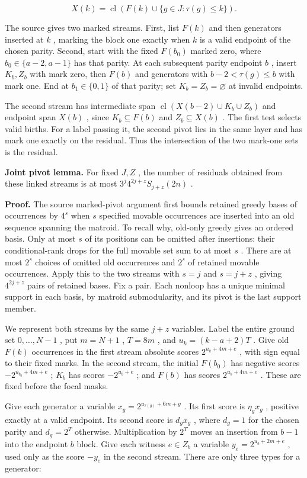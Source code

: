 \documentclass[11pt]{article}
\begin{document}
\[X(k)=\operatorname{cl}(F(k)\cup\{g\in J:\tau(g)\le k\}).\]

The source gives two marked streams. First, list \(F(k)\) and then generators inserted at \(k\) , marking the block one exactly when \(k\) is a valid endpoint of the chosen parity. Second, start with the fixed \(F(b_0)\) marked zero, where \(b_0\in\{a-2,a-1\}\) has that parity. At each subsequent parity endpoint \(b\) , insert \(K_b,Z_b\) with mark zero, then \(F(b)\) and generators with \(b-2<\tau(g)\le b\) with mark one. End at \(b_1\in\{0,1\}\) of that parity; set \(K_b=Z_b=\varnothing\) at invalid endpoints.

The second stream has intermediate span \(\operatorname{cl}(X(b-2)\cup K_b\cup Z_b)\) and endpoint span \(X(b)\) , since \(K_b\subseteq F(b)\) and \(Z_b\subseteq X(b)\) . The first test selects valid births. For a label passing it, the second pivot lies in the same layer and has mark one exactly on the residual. Thus the intersection of the two mark-one sets is the residual.

\textbf{Joint pivot lemma.} For fixed \(J,Z\) , the number of residuals obtained from these linked streams is at most \(3^j4^{2j+z}S_{j+z}(2n)\) .

\textbf{Proof.} The source marked-pivot argument first bounds retained greedy bases of occurrences by \(4^s\) when \(s\) specified movable occurrences are inserted into an old sequence spanning the matroid. To recall why, old-only greedy gives an ordered basis. Only at most \(s\) of its positions can be omitted after insertions: their conditional-rank drops for the full movable set sum to at most \(s\) . There are at most \(2^s\) choices of omitted old occurrences and \(2^s\) of retained movable occurrences. Apply this to the two streams with \(s=j\) and \(s=j+z\) , giving \(4^{2j+z}\) pairs of retained bases. Fix a pair. Each nonloop has a unique minimal support in each basis, by matroid submodularity, and its pivot is the last support member.

We represent both streams by the same \(j+z\) variables. Label the entire ground set \(0,\ldots,N-1\) , put \(m=N+1\) , \(T=8m\) , and \(u_k=(k-a+2)T\) . Give old \(F(k)\) occurrences in the first stream absolute scores \(2^{u_k+4m+e}\) , with sign equal to their fixed marks. In the second stream, the initial \(F(b_0)\) has negative scores \(-2^{u_{b_0}+4m+e}\) ; \(K_b\) has scores \(-2^{u_b+e}\) ; and \(F(b)\) has scores \(2^{u_b+4m+e}\) . These are fixed before the focal masks.

Give each generator a variable \(x_g=2^{u_{\tau(g)}+6m+g}\) . Its first score is \(\eta_gx_g\) , positive exactly at a valid endpoint. Its second score is \(d_gx_g\) , where \(d_g=1\) for the chosen parity and \(d_g=2^T\) otherwise. Multiplication by \(2^T\) moves an insertion from \(b-1\) into the endpoint \(b\) block. Give each witness \(e\in Z_b\) a variable \(y_e=2^{u_b+2m+e}\) , used only as the score \(-y_e\) in the second stream. There are only three types for a generator:
\end{document}
